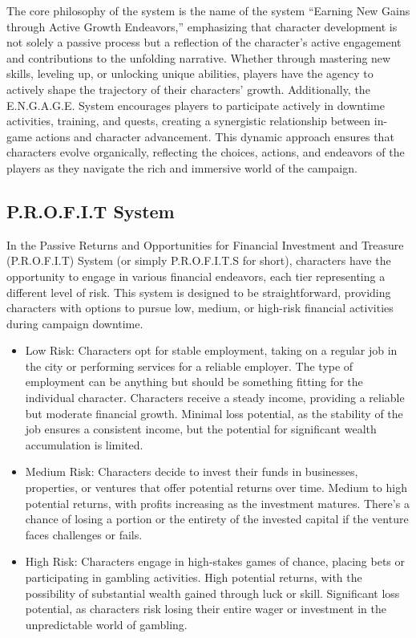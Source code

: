 The core philosophy of the system is the name of the system ``Earning New Gains through Active Growth Endeavors,'' emphasizing that character development is not solely a passive process but a reflection of the character's active engagement and contributions to the unfolding narrative. Whether through mastering new skills, leveling up, or unlocking unique abilities, players have the agency to actively shape the trajectory of their characters' growth. Additionally, the E.N.G.A.G.E. System encourages players to participate actively in downtime activities, training, and quests, creating a synergistic relationship between in-game actions and character advancement. This dynamic approach ensures that characters evolve organically, reflecting the choices, actions, and endeavors of the players as they navigate the rich and immersive world of the campaign.

\subsection{P.R.O.F.I.T System}

In the Passive Returns and Opportunities for Financial Investment and Treasure (P.R.O.F.I.T) System (or simply P.R.O.F.I.T.S for short), characters have the opportunity to engage in various financial endeavors, each tier representing a different level of risk. This system is designed to be straightforward, providing characters with options to pursue low, medium, or high-risk financial activities during campaign downtime.

\begin{itemize}
\item Low Risk: Characters opt for stable employment, taking on a regular job in the city or performing services for a reliable employer. The type of employment can be anything but should be something fitting for the individual character. Characters receive a steady income, providing a reliable but moderate financial growth. Minimal loss potential, as the stability of the job ensures a consistent income, but the potential for significant wealth accumulation is limited.

\item Medium Risk: Characters decide to invest their funds in businesses, properties, or ventures that offer potential returns over time. Medium to high potential returns, with profits increasing as the investment matures. There's a chance of losing a portion or the entirety of the invested capital if the venture faces challenges or fails.

\item High Risk: Characters engage in high-stakes games of chance, placing bets or participating in gambling activities. High potential returns, with the possibility of substantial wealth gained through luck or skill. Significant loss potential, as characters risk losing their entire wager or investment in the unpredictable world of gambling.
\end{itemize}

